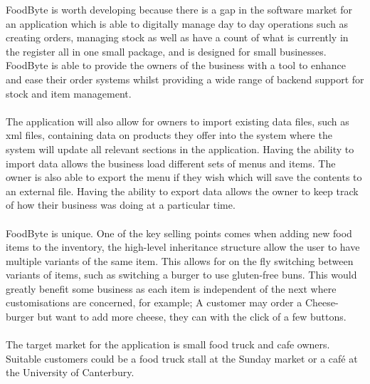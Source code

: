 FoodByte is worth developing because there is a gap in the software market for an application which is able to digitally manage day to day operations such as creating orders, managing stock as well as have a count of what is currently in the register all in one small package, and is designed for small businesses. FoodByte is able to provide the owners of the business with a tool to enhance and ease their order systems whilst providing a wide range of backend support for stock and item management.
\\ \\
The application will also allow for owners to import existing data files, such as xml files, containing data on products they offer into the system where the system will update all relevant sections in the application. Having the ability to import data allows the business load different sets of menus and items. The owner is also able to export the menu if they wish which will save the contents to an external file. Having the ability to export data allows the owner to keep track of how their business was doing at a particular time.
\\ \\
FoodByte is unique. One of the key selling points comes when adding new food items to the inventory, the high-level inheritance structure allow the user to have multiple variants of the same item. This allows for on the fly switching between variants of items, such as switching a burger to use gluten-free buns. This would greatly benefit some business as each item is independent of the next where customisations are concerned, for example; A customer may order a Cheese-burger but want to add more cheese, they can with the click of a few buttons.
\\ \\
The target market for the application is small food truck and cafe owners. Suitable customers could be a food truck stall at the Sunday market or a café at the University of Canterbury.